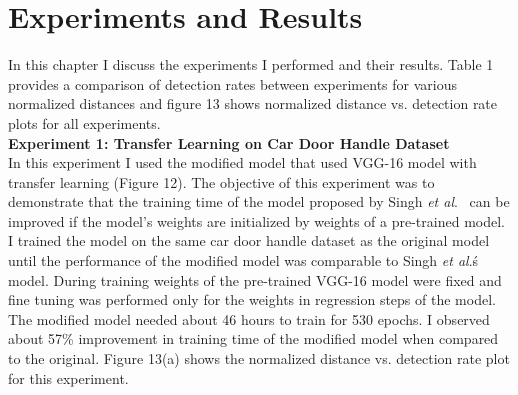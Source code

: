 \documentclass [11pt,letterpaper ,twoside ,openany ]{report}
\begin{document}
    \chapter{Experiments and Results}
    \doublespacing

    In this chapter I discuss the experiments I performed and their results. Table 1 provides a comparison of detection rates between experiments for various normalized distances and figure 13 shows normalized distance vs. detection rate plots for all experiments.\\

    \noindent
    \textbf{Experiment 1: Transfer Learning on Car Door Handle Dataset}\\    
    In this experiment I used the modified model that used VGG-16 model with transfer learning (Figure 12). The objective of this experiment was to demonstrate that the training time of the model proposed by Singh \textit{et al}.\ \cite{Singh_2016_CVPR} can be improved if the model's weights are initialized by weights of a pre-trained model. I trained the model on the same car door handle dataset as the original model until the performance of the modified model was comparable to Singh \textit{et al}.\'s model. During training weights of the pre-trained VGG-16 model were fixed and fine tuning was performed only for the weights in regression steps of the model. The modified model needed about 46 hours to train for 530 epochs. I observed about 57\% improvement in training time of the modified model when compared to the original. Figure 13(a) shows the normalized distance vs. detection rate plot for this experiment.
\end{document}
